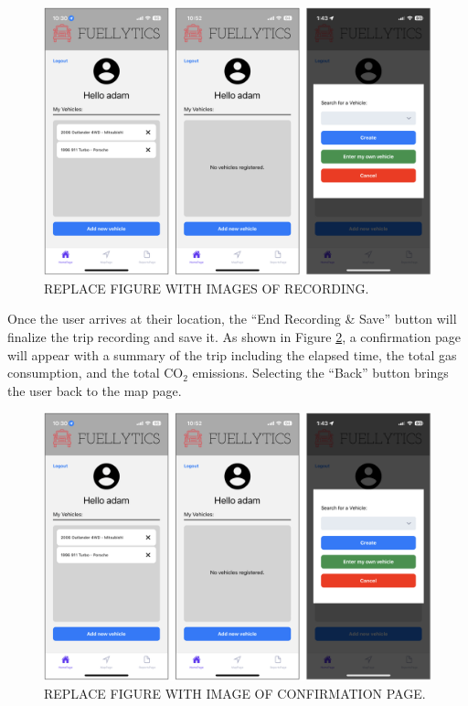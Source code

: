 \documentclass[11pt, oneside]{article}
\begin{document}
\begin{figure}[H]
\centerline{\includegraphics[width=16.5cm]{img/homepage.png}}
\caption{\label{fig:recording} REPLACE FIGURE WITH IMAGES OF RECORDING.}
\end{figure}

Once the user arrives at their location, the ``End Recording \& Save'' button will finalize the trip recording and save it.  As shown in Figure \ref*{fig:confirmation}, a confirmation page will appear with a summary of the trip including the elapsed time, the total gas consumption, and the total CO$_2$ emissions. Selecting the ``Back'' button brings the user back to the map page.
\begin{figure}[H]
\centerline{\includegraphics[width=16.5cm]{img/homepage.png}}
\caption{\label{fig:confirmation} REPLACE FIGURE WITH IMAGE OF CONFIRMATION PAGE.}
\end{figure}
\end{document}
